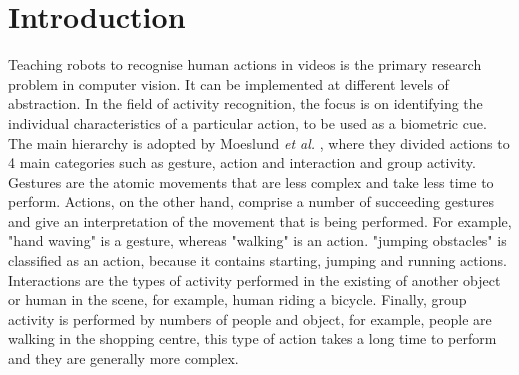 \documentclass{vldb}
\begin{document}
\section{Introduction}
Teaching robots to recognise human actions in videos is the primary research problem in computer vision. It can be implemented at different levels of abstraction. In the field of activity recognition, the focus is on identifying the individual characteristics of a particular action, to be used as a biometric cue. The main hierarchy is adopted by Moeslund \textit{et al.} \cite{moeslund2006survey}, where they divided actions to 4 main categories such as gesture, action and interaction and group activity. Gestures are the atomic movements that are less complex and take less time to perform. Actions, on the other hand, comprise a number of succeeding gestures and give an interpretation of the movement that is being performed. For example, "hand waving" is a gesture, whereas "walking" is an action. "jumping obstacles" is classified as an action, because it contains starting, jumping and running actions. Interactions are the types of activity performed in the existing of another object or human in the scene, for example, human riding a bicycle. Finally, group activity is performed by numbers of people and object, for example, people are walking in the shopping centre, this type of action takes a long time to perform and they are generally more complex.
\end{document}
